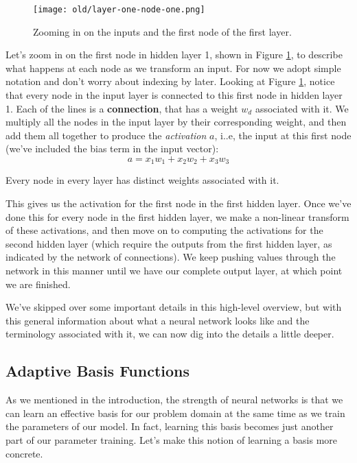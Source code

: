 \begin{figure}
    \centering
    \texttt{[image: old/layer-one-node-one.png]}
    \caption{Zooming in on the inputs and the first node of the first layer.}
    \label{fig:layer-one-node-one}
\end{figure}

 Let's zoom in on the first node in hidden layer 1, shown in Figure \ref{fig:layer-one-node-one}, to describe what happens at each node as we transform an input. For now we adopt simple notation and don't worry about indexing by later.
Looking at Figure \ref{fig:layer-one-node-one}, notice that every node in the input layer is connected to this first node in hidden layer 1. Each of the lines is a \textbf{connection}, that has a weight $w_{d}$ associated with it. We multiply all the nodes in the input layer by their corresponding weight, and then add them all together to produce the {\em activation} $a$, i..e,  the input at this first node (we've included the bias term in the input vector):
\begin{equation}
	a = x_{1} w_{1} + x_{2} w_{2} + x_{3} w_{3}
\end{equation}
\begin{warning}
    Every node in every layer has distinct weights associated with it.
\end{warning}

This gives us the activation for the first node in the first hidden layer. Once we've done this for every node in the first hidden layer, we make a non-linear transform of these activations, and then move on to computing the activations for the second hidden layer (which require the outputs from the first hidden layer, as indicated by the network of connections). We keep pushing values through the network in this manner until we have our complete output layer, at which point we are finished.

We've skipped over some important details in this high-level overview, but with this general information about what a neural network looks like and the terminology associated with it, we can now dig into the details a little deeper.

\subsection{Adaptive Basis Functions}
As we mentioned in the introduction, the strength of neural networks is that we can learn an effective basis for our problem domain at the same time as we train the parameters of our model. In fact, learning this basis becomes just another part of our parameter training. Let's make this notion of learning a basis more concrete.

